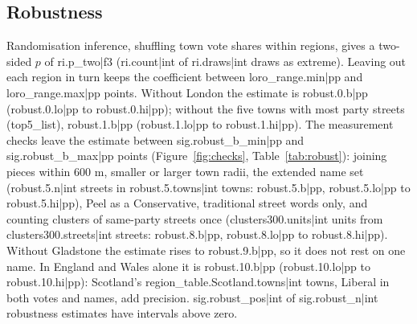 \documentclass[11pt,a4paper]{article}
\begin{document}
\subsection{Robustness}
Randomisation inference, shuffling town vote shares within regions, gives a two-sided $p$ of {{ri.p_two|f3}} ({{ri.count|int}} of {{ri.draws|int}} draws as extreme). Leaving out each region in turn keeps the coefficient between {{loro_range.min|pp}} and {{loro_range.max|pp}} points. Without London the estimate is {{robust.0.b|pp}} ({{robust.0.lo|pp}} to {{robust.0.hi|pp}}); without the five towns with most party streets ({{top5_list}}), {{robust.1.b|pp}} ({{robust.1.lo|pp}} to {{robust.1.hi|pp}}). The measurement checks leave the estimate between {{sig.robust_b_min|pp}} and {{sig.robust_b_max|pp}} points (Figure~\ref{fig:checks}, Table~\ref{tab:robust}): joining pieces within 600 m, smaller or larger town radii, the extended name set ({{robust.5.n|int}} streets in {{robust.5.towns|int}} towns: {{robust.5.b|pp}}, {{robust.5.lo|pp}} to {{robust.5.hi|pp}}), Peel as a Conservative, traditional street words only, and counting clusters of same-party streets once ({{clusters300.units|int}} units from {{clusters300.streets|int}} streets: {{robust.8.b|pp}}, {{robust.8.lo|pp}} to {{robust.8.hi|pp}}). Without Gladstone the estimate rises to {{robust.9.b|pp}}, so it does not rest on one name. In England and Wales alone it is {{robust.10.b|pp}} ({{robust.10.lo|pp}} to {{robust.10.hi|pp}}): Scotland's {{region_table.Scotland.towns|int}} towns, Liberal in both votes and names, add precision. {{sig.robust_pos|int}} of {{sig.robust_n|int}} robustness estimates have intervals above zero.
\end{document}
